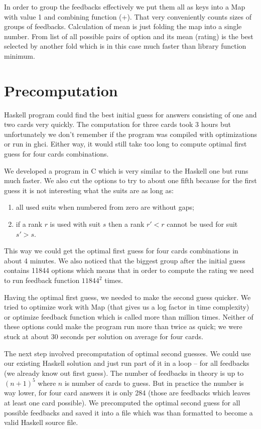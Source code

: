 \documentclass{article}
\begin{document}
In order to group the feedbacks effectively we put them all as keys into a Map with value 1 and combining function (+).
That very conveniently counts sizes of groups of feedbacks.
Calculation of mean is just folding the map into a single number.
From list of all possible pairs of option and its mean (rating) is the best selected by another fold which is in this case much faster than library function minimum.

\section{Precomputation}

Haskell program could find the best initial guess for answers consisting of one and two cards very quickly.
The computation for three cards took 3 hours but unfortunately we don't remember if the program was compiled with optimizations or run in ghci.
Either way, it would still take too long to compute optimal first guess for four cards combinations.

We developed a program in C which is very similar to the Haskell one but runs much faster.
We also cut the options to try to about one fifth because for the first guess it is not interesting what the suits are as long as:
\begin{enumerate}
\item all used suits when numbered from zero are without gaps;
\item if a rank $r$ is used with suit $s$ then a rank $r' < r$ cannot be used for suit $s' > s$.
\end{enumerate}
This way we could get the optimal first guess for four cards combinations in about 4 minutes.
We also noticed that the biggest group after the initial guess contains 11844 options which means that in order to compute the rating we need to run feedback function $11844^2$ times.

Having the optimal first guess, we needed to make the second guess quicker.
We tried to optimize work with Map (that gives us a log factor in time complexity) or optimize feedback function which is called more than million times.
Neither of these options could make the program run more than twice as quick; we were stuck at about 30 seconds per solution on average for four cards.

The next step involved precomputation of optimal second guesses.
We could use our existing Haskell solution and just run part of it in a loop -- for all feedbacks (we already know out first guess).
The number of feedbacks in theory is up to $(n+1)^5$ where $n$ is number of cards to guess.
But in practice the number is way lower, for four card answers it is only 284 (those are feedbacks which leaves at least one card possible).
We precomputed the optimal second guess for all possible feedbacks and saved it into a file which was than formatted to become a valid Haskell source file.
\end{document}
